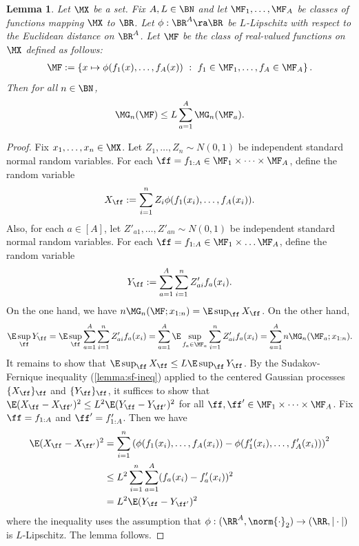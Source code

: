 \documentclass[11pt, oneside]{article}
\theoremstyle{plain}
\newtheorem{lemma}[theorem]{Lemma}
\theoremstyle{definition}
\numberwithin{theorem}{section}
\renewcommand{\^}[1]{^{(#1)}}
\begin{document}
\begin{lemma}
  \label{lem:rc-composition}
  Let $\MX$ be a set. Fix $A,L \in \BN$ and let $\MF_1, \ldots, \MF_A$ be classes of functions mapping $\MX$ to $\BR$. Let $\phi : \BR^A \ra \BR$ be $L$-Lipschitz with respect to the Euclidean distance on $\BR^A$. Let $\MF$ be the class of real-valued functions on $\MX$ defined as follows:
  \begin{align}
\MF := \left\{ x \mapsto \phi(f_1(x), \ldots, f_A(x)) \ : \ f_1 \in \MF_1, \ldots, f_A \in \MF_A \right\}\nonumber.
  \end{align}
  Then for all $n \in \BN$, 
  \begin{align}
\MG_n(\MF) \leq L \sum_{a=1}^A \MG_n(\MF_a)\nonumber.
  \end{align}
\end{lemma}

\begin{proof}
Fix $x_1,\dots,x_n \in \MX$. Let $Z_1,\dots,Z_n \sim N(0,1)$ be independent standard normal random variables. For each $\ff = f_{1:A} \in \MF_1 \times \dots \times \MF_A$, define the random variable
\[X_{\ff} := \sum_{i=1}^n Z_i \phi(f_1(x_i),\dots,f_A(x_i)).\]
Also, for each $a \in [A]$, let $Z'_{a1},\dots,Z'_{an} \sim N(0,1)$ be independent standard normal random variables. For each $\ff = f_{1:A} \in \MF_1 \times \dots \MF_A$, define the random variable
\[Y_{\ff} := \sum_{a = 1}^A \sum_{i=1}^n Z'_{ai} f_a(x_i).\]
On the one hand, we have $n\MG_n(\MF;x_{1:n}) = \E \sup_{\ff} X_{\ff}$. On the other hand, \[\E\sup_{\ff}Y_{\ff} = \E \sup_{\ff} \sum_{a=1}^A \sum_{i=1}^n Z'_{ai} f_a(x_i) = \sum_{a=1}^A \E \sup_{f_a \in \MF_a} \sum_{i=1}^n Z'_{ai} f_a(x_i) = \sum_{a=1}^A n\MG_n(\MF_a; x_{1:n}).\]
It remains to show that $\E \sup_{\ff} X_\ff \leq L\E \sup_\ff Y_\ff$. By the Sudakov-Fernique inequality (\cref{lemma:sf-ineq}) applied to the centered Gaussian processes $\{X_\ff\}_\ff$ and $\{Y_\ff\}_\ff$, it suffices to show that $\E(X_\ff - X_{\ff'})^2 \leq L^2\E(Y_\ff - Y_{\ff'})^2$ for all $\ff,\ff' \in \MF_1\times\dots\times\MF_A$. Fix $\ff = f_{1:A}$ and $\ff' = f'_{1:A}$. Then we have
\begin{align*}
\E(X_\ff - X_{\ff'})^2
&= \sum_{i=1}^n \left(\phi(f_1(x_i),\dots,f_A(x_i)) - \phi(f'_1(x_i),\dots,f'_A(x_i))\right)^2 \\
&\leq L^2 \sum_{i=1}^n \sum_{a=1}^A (f_a(x_i) - f'_a(x_i))^2 \\ 
&= L^2 \E(Y_\ff - Y_{\ff'})^2
\end{align*}
where the inequality uses the assumption that $\phi: (\RR^A,\norm{\cdot}_2) \to (\RR,|\cdot|)$ is $L$-Lipschitz. The lemma follows.
\end{proof}
\end{document}
